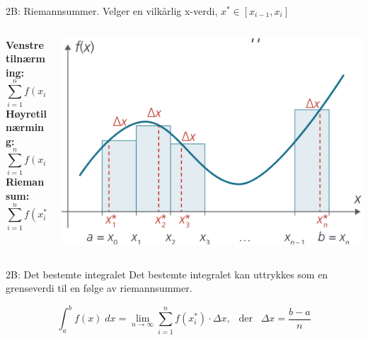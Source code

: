 
\blueheader
\begin{frame}{2B: Riemannsummer. Velger en vilkårlig x-verdi, $x^*\in[x_{i-1},x_i]$}
    \begin{columns} 
        \begin{column}{0.35\textwidth}
    \textbf{Venstretilnærming:}
        \begin{equation*}
            \sum_{i=1}^n f(x_{i-1})\cdot \Delta x
        \end{equation*}
      \textbf{Høyretilnærming:}
        \begin{equation*}
            \sum_{i=1}^n f(x_{i})\cdot \Delta x
        \end{equation*}
    \textbf{Riemansum:}
       \begin{equation*}
            \sum_{i=1}^n f(x^*_{i})\cdot \Delta x
        \end{equation*}
        \end{column}
        \begin{column}{0.65\textwidth}
            \centering
            \includegraphics[width=1\linewidth]{R2-K2B-1.png}
        \end{column}
    \end{columns}
\end{frame}

\redheader
\begin{frame}{2B: Det bestemte integralet}
    Det bestemte integralet kan uttrykkes som en grenseverdi til en følge av riemannsummer.

    \begin{equation*}
        \int_a^b f(x)\;dx=\lim_{n\rightarrow\infty}\sum_{i=1}^nf(x_i^*)\cdot \Delta x, \:\;\; \text{der} \;\;\; \Delta x = \frac{b-a}{n}
    \end{equation*}
\end{frame}

